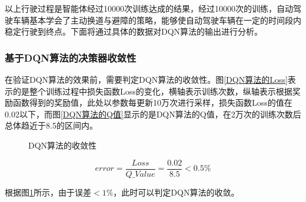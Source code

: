 以上行驶过程是智能体经过10000次训练达成的结果，经过10000次的训练，自动驾驶车辆基本学会了主动换道与避障的策略，能够使自动驾驶车辆在一定的时间段内稳定行驶到终点。下面将通过具体的数据对DQN算法的输出进行分析。

\subsubsection{基于DQN算法的决策器收敛性}

在验证DQN算法的效果前，需要判定DQN算法的收敛性。图\ref{DQN算法的Loss}表示的是整个训练过程中损失函数Loss的变化，横轴表示训练次数，纵轴表示根据奖励函数得到的奖励值，此处以参数每更新10万次进行采样，损失函数Loss的值在0.02以下，而图\ref{DQN算法的Q值}显示的是DQN算法的Q值，在2万次的训练次数后总体趋近于8.5的区间内。

\begin{figure}[htbp]
    \vspace{13pt}
    \centering
    \caption{DQN算法的收敛性}\label{DQN算法的收敛性} 
\end{figure}

\begin{equation}
    error = \frac{Loss}{Q\_Value} = \frac{0.02}{8.5} < 0.5\%
\end{equation}\label{dqn-decision-error}

根据图\ref{DQN算法的收敛性}所示，由于误差$<1\%$，此时可以判定DQN算法的收敛。


